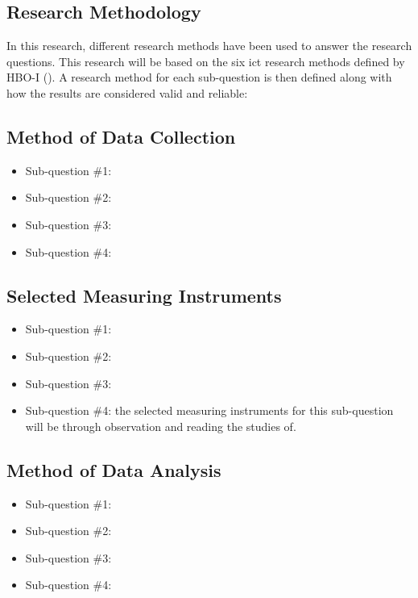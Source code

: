 \begin{multicols}{2}
      \section{Research Methodology}
      In this research, different research methods have been used to answer the research questions. This research
      will be based on the six \acrshort{ict} research methods defined by HBO-I (\cite{ictresearchmethods}). A
      research method for each sub-question is then defined along with how the results are considered valid and
      reliable:
      \subsection{Method of Data Collection}
      \begin{itemize}[label=-]
            \item Sub-question \#1:
            \item Sub-question \#2:
            \item Sub-question \#3:
            \item Sub-question \#4:
      \end{itemize}
      \subsection{Selected Measuring Instruments}
      \begin{itemize}[label=-]
            \item Sub-question \#1:
            \item Sub-question \#2:
            \item Sub-question \#3:
            \item Sub-question \#4: the selected measuring instruments for this sub-question will be through
                  observation and reading the studies of.
      \end{itemize}
      \subsection{Method of Data Analysis}
      \begin{itemize}[label=-]
            \item Sub-question \#1:
            \item Sub-question \#2:
            \item Sub-question \#3:
            \item Sub-question \#4:
      \end{itemize}

\end{multicols}
